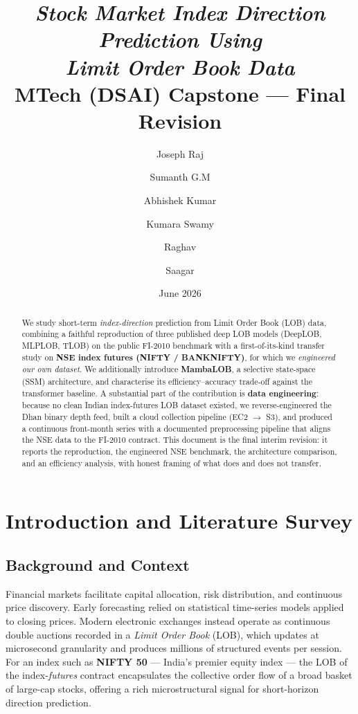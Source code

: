 \documentclass[11pt]{article}
\title{\textbf{\textit{Stock Market Index Direction Prediction Using\\ Limit Order Book Data}}\\[4pt]
\large MTech (DSAI) Capstone --- Final Revision}
\author{Joseph Raj \and Sumanth G.M \and Abhishek Kumar \and Kumara Swamy \and Raghav \and Saagar}
\date{June 2026}
\begin{document}
\maketitle
\thispagestyle{empty}

\begin{abstract}
\noindent We study short-term \emph{index-direction} prediction from Limit Order Book (LOB) data, combining
a faithful reproduction of three published deep LOB models (DeepLOB, MLPLOB, TLOB) on the public FI-2010
benchmark with a first-of-its-kind transfer study on \textbf{NSE index futures (NIFTY / BANKNIFTY)}, for
which we \emph{engineered our own dataset}. We additionally introduce \textbf{MambaLOB}, a selective
state-space (SSM) architecture, and characterise its efficiency--accuracy trade-off against the
transformer baseline. A substantial part of the contribution is \textbf{data engineering}: because no
clean Indian index-futures LOB dataset existed, we reverse-engineered the Dhan binary depth feed, built a
cloud collection pipeline (EC2 $\rightarrow$ S3), and produced a continuous front-month series with a
documented preprocessing pipeline that aligns the NSE data to the FI-2010 contract. This document is the
final interim revision: it reports the reproduction, the engineered NSE benchmark, the architecture
comparison, and an efficiency analysis, with honest framing of what does and does not transfer.
\end{abstract}

\tableofcontents
\clearpage

\section{Introduction and Literature Survey}

\subsection{Background and Context}
Financial markets facilitate capital allocation, risk distribution, and continuous price discovery.
Early forecasting relied on statistical time-series models applied to closing prices. Modern electronic
exchanges instead operate as continuous double auctions recorded in a \emph{Limit Order Book} (LOB),
which updates at microsecond granularity and produces millions of structured events per session. For an
index such as \textbf{NIFTY 50} --- India's premier equity index --- the LOB of the index-\emph{futures}
contract encapsulates the collective order flow of a broad basket of large-cap stocks, offering a rich
microstructural signal for short-horizon direction prediction.
\end{document}
